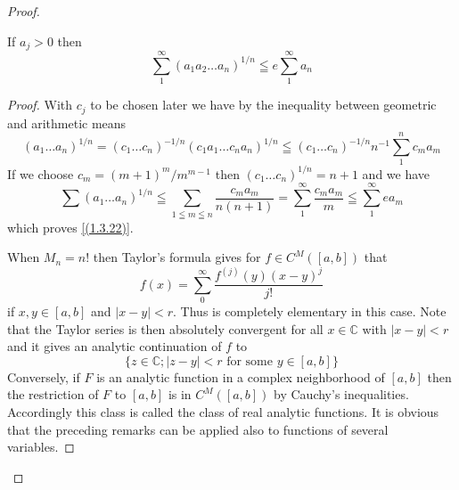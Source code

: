 \begin{proof}
\begin{lemma}
    If $a_{j}>0$ then
\begin{equation}
    \label{(1.3.22)}
	\sum_{1}^{\infty}\left(a_{1} a_{2} \ldots a_{n}\right)^{1 / n} \leqq e \sum_{1}^{\infty} a_{n} 
\end{equation}
\end{lemma}
\begin{proof}
    With $c_{j}$ to be chosen later we have by the inequality between geometric and arithmetic means
\[
	\left(a_{1} \ldots a_{n}\right)^{1 / n}=\left(c_{1} \ldots c_{n}\right)^{-1 / n}\left(c_{1} a_{1} \ldots c_{n} a_{n}\right)^{1 / n} \leqq\left(c_{1} \ldots c_{n}\right)^{-1 / n} n^{-1} \sum_{1}^{n} c_{m} a_{m}
\]
If we choose $c_{m}=(m+1)^{m} / m^{m-1}$ then $\left(c_{1} \ldots c_{n}\right)^{1 / n}=n+1$ and we have
\[
	\sum\left(a_{1} \ldots a_{n}\right)^{1 / n} \leqq \sum_{1 \leqq m \leqq n} \frac{c_{m} a_{m}}{n(n+1)}=\sum_{1}^{\infty} \frac{c_{m} a_{m}}{m} \leqq \sum_{1}^{\infty} e a_{m}
\]
which proves \eqref{(1.3.22)}.

When $M_{n}=n!$ then Taylor's formula gives for $f \in C^{M}([a, b])$ that
\[
	f(x)=\sum_{0}^{\infty} \frac{f^{(j)}(y)(x-y)^{j}}{j!}
\]
if $x, y \in[a, b]$ and $|x-y|<r$. Thus  is completely elementary in this case. Note that the Taylor series is then absolutely convergent for all $x \in \mathbb{C}$ with $|x-y|<r$ and it gives an analytic continuation of $f$ to
\[
	\{z \in \mathbb{C} ;|z-y|<r \text { for some } y \in[a, b]\}
\]
Conversely, if $F$ is an analytic function in a complex neighborhood of $[a, b]$ then the restriction of $F$ to $[a, b]$ is in $C^{M}([a, b])$ by Cauchy's inequalities. Accordingly this class is called the class of real analytic functions. It is obvious that the preceding remarks can be applied also to functions of several variables.
\qedhere\qedsymbol\end{proof}\def\qedsymbol{}
\end{proof}

